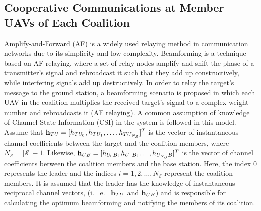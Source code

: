 \documentclass[conference]{IEEEtran}
\theoremstyle{remark}
\theoremstyle{lemma}
\def\bh{{\bf h}}
\begin{document}
\subsection{Cooperative Communications at Member UAVs of Each Coalition} \label{sec:beam}
Amplify-and-Forward (AF) is a widely used relaying method in communication networks due to its simplicity and low-complexity.  Beamforming is a technique based on AF relaying, where a set of relay nodes amplify and shift the phase of a transmitter's signal and rebroadcast it such that they add up constructively, while interfering signals add up destructively.
In order to relay the target's message to the ground station, a beamforming scenario is proposed in which each UAV in the coalition multiplies the received target's signal to a complex weight number and rebroadcasts it (AF relaying). A common assumption of knowledge of Channel State Information (CSI) in the system is followed in this model\cite{Zaeri2012,zaeri2016}. Assume that $\bh_{TU} = [h_{TU_0},h_{TU_1}, \ldots,h_{TU_{N_{\mathcal{S}}}}]^T$ is the vector of instantaneous channel coefficients between the target and the coalition members, where $N_{\mathcal{S}} = |\mathcal{S}|-1$. Likewise,  $\bh_{UB} = [h_{U_0B},h_{U_1B}, \ldots,h_{U_{N_{\mathcal{S}}}B}]^T$ is the vector of channel coefficients between the coalition members and the base station. Here, the index $0$ represents the leader and the indices $i = 1,2,\ldots,N_{\mathcal{S}}$ represent the coalition members. It is assumed that the leader has the knowledge of instantaneous reciprocal channel vectors, (i.~ e.~ $\bh_{TU}$ and $\bh_{UB}$) and is responsible for calculating the optimum beamforming and notifying the members of its coalition.
\end{document}
